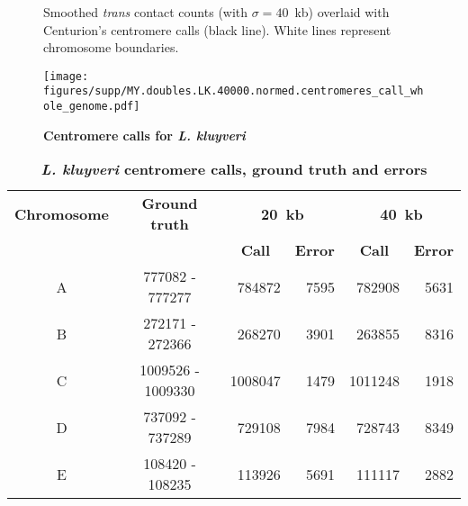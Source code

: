 \begin{figure}[ht!]

\caption{\textbf{Centromere calls for \textit{L. kluyveri}}}{
Smoothed \textit{trans} contact counts (with $\sigma=40$~kb) overlaid with
Centurion's centromere calls (black line). White lines represent chromosome
boundaries.
}
\begin{center}
\texttt{[image: figures/supp/MY.doubles.LK.40000.normed.centromeres\_call\_whole\_genome.pdf]}
\end{center}
\label{suppfig:LK_calls}
\end{figure}

\begin{table}[ht!]
\caption{\textbf{\textit{L. kluyveri} centromere calls, ground truth and
errors}}
\begin{center}
\begin{tabular}{c | c  r  r  r  r}
\textbf{Chromosome}  & \textbf{Ground truth} & \multicolumn{2}{c}{\textbf{20~kb}} & \multicolumn{2}{c}{\textbf{40~kb}} \\
  &   &  \multicolumn{1}{c}{\textbf{Call}} &  \multicolumn{1}{c}{\textbf{Error}} &  \multicolumn{1}{c}{\textbf{Call}} &  \multicolumn{1}{c}{\textbf{Error}} \\
\hline
A & \num[group-separator={\,}]{777082} - \num[group-separator={\,}]{777277} & \num[group-separator={\,}]{784872} & \small{\num[group-separator={\,}]{7595}}  & \num[group-separator={\,}]{782908} & \small{\num[group-separator={\,}]{5631}}  \\
B & \num[group-separator={\,}]{272171} - \num[group-separator={\,}]{272366} & \num[group-separator={\,}]{268270} & \small{\num[group-separator={\,}]{3901}}  & \num[group-separator={\,}]{263855} & \small{\num[group-separator={\,}]{8316}}  \\
C & \num[group-separator={\,}]{1009526} - \num[group-separator={\,}]{1009330} & \num[group-separator={\,}]{1008047} & \small{\num[group-separator={\,}]{1479}}  & \num[group-separator={\,}]{1011248} & \small{\num[group-separator={\,}]{1918}}  \\
D & \num[group-separator={\,}]{737092} - \num[group-separator={\,}]{737289} & \num[group-separator={\,}]{729108} & \small{\num[group-separator={\,}]{7984}}  & \num[group-separator={\,}]{728743} & \small{\num[group-separator={\,}]{8349}}  \\
E & \num[group-separator={\,}]{108420} - \num[group-separator={\,}]{108235} & \num[group-separator={\,}]{113926} & \small{\num[group-separator={\,}]{5691}}  & \num[group-separator={\,}]{111117} & \small{\num[group-separator={\,}]{2882}}  \\

\end{tabular}
\end{center}
\end{table}
